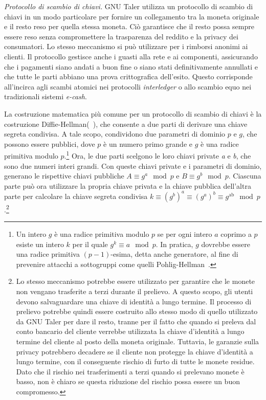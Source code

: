 \documentclass{article}
\begin{document}
\emph{Protocollo di scambio di chiavi.} GNU Taler utilizza un protocollo 
di scambio di chiavi in un modo particolare per fornire un collegamento 
tra la moneta originale e il resto reso per quella stessa moneta. Ciò 
garantisce che il resto possa sempre essere reso senza compromettere 
la trasparenza del reddito e la privacy dei consumatori. Lo stesso 
meccanismo si può utilizzare per i rimborsi anonimi ai clienti. Il 
protocollo gestisce anche i guasti alla rete e ai componenti, 
assicurando che i pagamenti siano andati a buon fine o siano stati 
definitivamente annullati e che tutte le parti abbiano una prova 
crittografica dell'esito. Questo corrisponde all'incirca agli scambi 
atomici nei protocolli \textit{interledger} o allo scambio equo nei 
tradizionali sistemi \textit{e-cash}.

La costruzione matematica più comune per un protocollo di scambio di 
chiavi è la costruzione Diffie-Hellman(~\cite{Diffie}), che 
consente a due parti di derivare una chiave segreta condivisa. A tale 
scopo, condividono due parametri di dominio $p$ e $g$, che possono 
essere pubblici, dove $p$ è un numero primo grande e $g$ è una radice 
primitiva modulo $p$.\footnote{Un intero $g$ è una radice primitiva 
modulo $p$ se per ogni intero $a$ coprimo a $p$ esiste un intero $k$ 
per il quale 
$g^k \equiv a \mod p$. 
In pratica, $g$ dovrebbe essere una radice primitiva $(p-1)$-esima, detta 
anche generatore, al fine di prevenire attacchi a sottogruppi come quelli 
Pohlig-Hellman~\cite[vedi][]{Lim}.} Ora, le due parti scelgono le loro 
chiavi private \emph{a} e \emph{b}, che sono due numeri interi grandi. 
Con queste chiavi private e i parametri di dominio, generano le 
rispettive chiavi pubbliche 
$A \equiv g^{a} \mod p$ e $B \equiv g^{b} \mod p$. 
Ciascuna parte può ora utilizzare la propria chiave privata e la chiave 
pubblica dell'altra parte per calcolare la chiave segreta condivisa 
$k \equiv \left( g^b \right)^{a} \equiv \left( g^{a} \right)^{b} \equiv g^{\text{ab}} \mod p$.\footnote{
Lo stesso meccanismo potrebbe essere utilizzato per garantire 
che le monete non vengano trasferite a terzi durante il prelievo. A 
questo scopo, gli utenti devono salvaguardare una chiave di identità a 
lungo termine. Il processo di prelievo potrebbe quindi essere 
costruito allo stesso modo di quello utilizzato da GNU Taler per dare 
il resto, tranne per il fatto che quando si preleva dal conto bancario 
del cliente verrebbe utilizzata la chiave d'identità a lungo termine 
del cliente al posto della moneta originale. Tuttavia, le garanzie 
sulla privacy potrebbero decadere se il cliente non protegge la chiave 
d'identità a lungo termine, con il conseguente rischio di furto di 
tutte le monete residue. Dato che il rischio nei trasferimenti a terzi 
quando si prelevano monete è basso, non è chiaro se questa riduzione 
del rischio possa essere un buon compromesso.}
\end{document}

